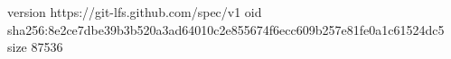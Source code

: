 version https://git-lfs.github.com/spec/v1
oid sha256:8e2ce7dbe39b3b520a3ad64010c2e855674f6ecc609b257e81fe0a1c61524dc5
size 87536
